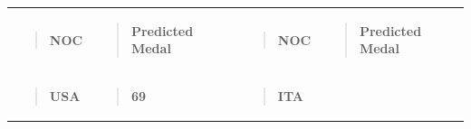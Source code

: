 \documentclass[12pt,a4paper]{article}
\renewenvironment{quote}{\begin{quotation}}{\end{quotation}}  %
\begin{document}
    \begin{longtable}[]{@{}
      >{\raggedright\arraybackslash}p{}
      >{\raggedright\arraybackslash}p{}
      >{\raggedright\arraybackslash}p{}
      >{\raggedright\arraybackslash}p{}@{}}
    \toprule\noalign{}
    \endhead
    \bottomrule\noalign{}
    \endlastfoot
    \begin{minipage}[t]{\linewidth}\raggedright
    \begin{quote}
    \textbf{NOC}
    \end{quote}
    \end{minipage} & \begin{minipage}[t]{\linewidth}\raggedright
    \begin{quote}
    \textbf{Predicted Medal}
    \end{quote}
    \end{minipage} & \begin{minipage}[t]{\linewidth}\raggedright
    \begin{quote}
    \textbf{NOC}
    \end{quote}
    \end{minipage} & \begin{minipage}[t]{\linewidth}\raggedright
    \begin{quote}
    \textbf{Predicted Medal}
    \end{quote}
    \end{minipage} \\
    \begin{minipage}[t]{\linewidth}\raggedright
    \begin{quote}
    \textbf{USA}
    \end{quote}
    \end{minipage} & \begin{minipage}[t]{\linewidth}\raggedright
    \begin{quote}
    \textbf{69}
    \end{quote}
    \end{minipage} & \begin{minipage}[t]{\linewidth}\raggedright
    \begin{quote}
    \textbf{ITA}
    \end{quote}
    \end{minipage} & \begin{minipage}[t]{\linewidth}\raggedright
    \begin{quote}

\end{quote}
\end{minipage}
\end{longtable}
\end{document}
